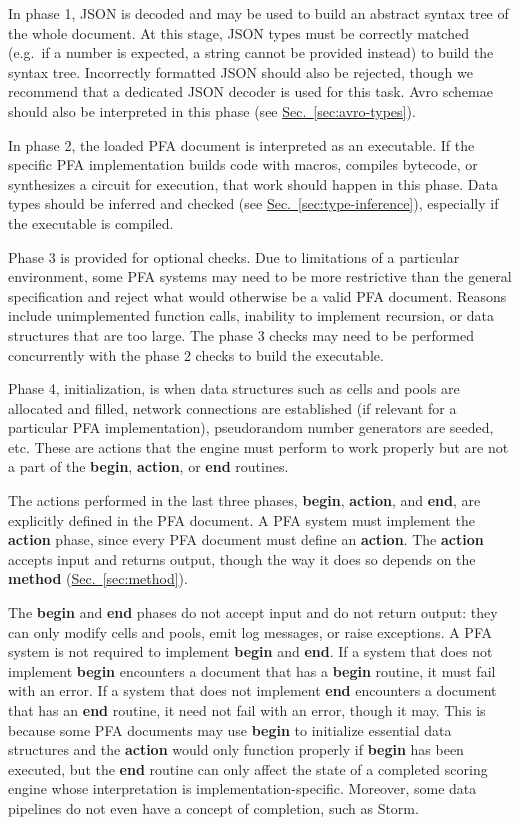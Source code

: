 \documentclass{article}
\newcommand{\PFAc}{\ttfamily\bfseries}
\theoremstyle{definition}
\begin{document}
In phase 1, JSON is decoded and may be used to build an abstract syntax tree of the whole document.  At this stage, JSON types must be correctly matched (e.g.\ if a number is expected, a string cannot be provided instead) to build the syntax tree.  Incorrectly formatted JSON should also be rejected, though we recommend that a dedicated JSON decoder is used for this task.  Avro schemae should also be interpreted in this phase (see \hyperlink{hsec:avro-types}{Sec.~\ref{sec:avro-types}}).

In phase 2, the loaded PFA document is interpreted as an executable.  If the specific PFA implementation builds code with macros, compiles bytecode, or synthesizes a circuit for execution, that work should happen in this phase.  Data types should be inferred and checked (see \hyperlink{hsec:type-inference}{Sec.~\ref{sec:type-inference}}), especially if the executable is compiled.

Phase 3 is provided for optional checks.  Due to limitations of a particular environment, some PFA systems may need to be more restrictive than the general specification and reject what would otherwise be a valid PFA document.  Reasons include unimplemented function calls, inability to implement recursion, or data structures that are too large.  The phase 3 checks may need to be performed concurrently with the phase 2 checks to build the executable.

Phase 4, initialization, is when data structures such as cells and pools are allocated and filled, network connections are established (if relevant for a particular PFA implementation), pseudorandom number generators are seeded, etc.  These are actions that the engine must perform to work properly but are not a part of the {\PFAc begin}, {\PFAc action}, or {\PFAc end} routines.

The actions performed in the last three phases, {\PFAc begin}, {\PFAc action}, and {\PFAc end}, are explicitly defined in the PFA document.  A PFA system must implement the {\PFAc action} phase, since every PFA document must define an {\PFAc action}.  The {\PFAc action} accepts input and returns output, though the way it does so depends on the {\PFAc method} (\hyperlink{hsec:method}{Sec.~\ref{sec:method}}).

The {\PFAc begin} and {\PFAc end} phases do not accept input and do not return output: they can only modify cells and pools, emit log messages, or raise exceptions.  A PFA system is not required to implement {\PFAc begin} and {\PFAc end}.  If a system that does not implement {\PFAc begin} encounters a document that has a {\PFAc begin} routine, it must fail with an error.  If a system that does not implement {\PFAc end} encounters a document that has an {\PFAc end} routine, it need not fail with an error, though it may.  This is because some PFA documents may use {\PFAc begin} to initialize essential data structures and the {\PFAc action} would only function properly if {\PFAc begin} has been executed, but the {\PFAc end} routine can only affect the state of a completed scoring engine whose interpretation is implementation-specific.  Moreover, some data pipelines do not even have a concept of completion, such as Storm.
\end{document}
